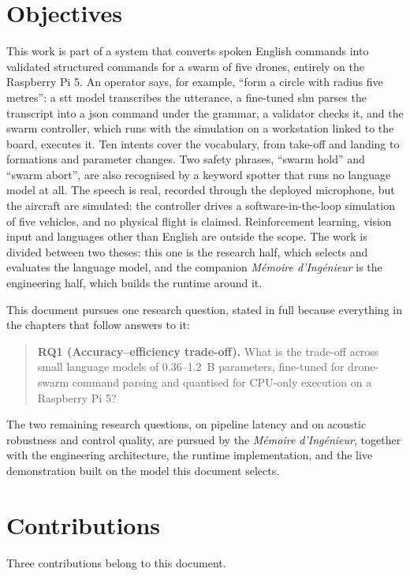 \noautobreak
\section{Objectives}
This work is part of a system that converts spoken English commands into validated structured
commands for a swarm of five drones, entirely on the Raspberry Pi 5. An operator says, for example,
``form a circle with radius five metres'': a \gls{stt} model transcribes the utterance, a fine-tuned
\gls{slm} parses the transcript into a \gls{json} command under the grammar, a validator checks it,
and the swarm controller, which runs with the simulation on a workstation linked to the board,
executes it. Ten intents cover the vocabulary, from take-off and landing
to formations and parameter changes. Two safety phrases, ``swarm hold'' and ``swarm abort'', are
also recognised by a keyword spotter that runs no language model at all. The speech is real,
recorded through the deployed microphone, but the aircraft are simulated: the controller drives a
software-in-the-loop simulation of five vehicles, and no physical flight is claimed.
Reinforcement learning, vision input and languages other than English are outside the scope.
The work is divided between two theses: this one is the research half, which selects and
evaluates the language model, and the companion \emph{M\'emoire d'Ing\'enieur} is the
engineering half, which builds the runtime around it.

This document pursues one research question, stated in full because everything in the chapters
that follow answers to it:

\begin{quote}
\textbf{RQ1 (Accuracy--efficiency trade-off).} What is the trade-off across small language models
of 0.36--1.2~B parameters, fine-tuned for drone-swarm command parsing and quantised for
CPU-only execution on a Raspberry Pi 5?
\end{quote}

The two remaining research questions, on pipeline latency and on acoustic robustness and control
quality, are pursued by the \emph{M\'emoire d'Ing\'enieur}, together with the engineering
architecture, the runtime implementation, and the live demonstration built on the model this
document selects.

\noautobreak
\section{Contributions}
Three contributions belong to this document.

